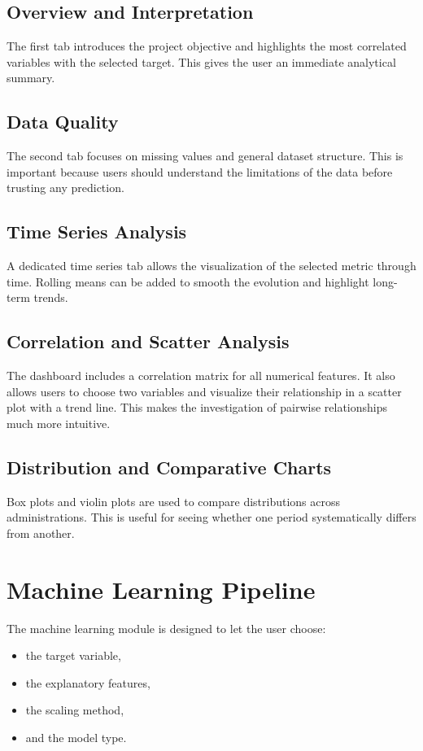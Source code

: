 \subsection{Overview and Interpretation}

The first tab introduces the project objective and highlights the most correlated variables with the selected target.
This gives the user an immediate analytical summary.

\subsection{Data Quality}

The second tab focuses on missing values and general dataset structure.
This is important because users should understand the limitations of the data before trusting any prediction.

\subsection{Time Series Analysis}

A dedicated time series tab allows the visualization of the selected metric through time.
Rolling means can be added to smooth the evolution and highlight long-term trends.

\subsection{Correlation and Scatter Analysis}

The dashboard includes a correlation matrix for all numerical features.
It also allows users to choose two variables and visualize their relationship in a scatter plot with a trend line.
This makes the investigation of pairwise relationships much more intuitive.

\subsection{Distribution and Comparative Charts}

Box plots and violin plots are used to compare distributions across administrations.
This is useful for seeing whether one period systematically differs from another.

\section{Machine Learning Pipeline}

The machine learning module is designed to let the user choose:
\begin{itemize}
\item the target variable,
\item the explanatory features,
\item the scaling method,
\item and the model type.
\end{itemize}


